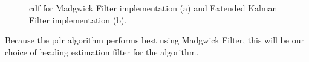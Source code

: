 \begin{figure}[H]
\centering
  \hfill
  \caption{\gls{cdf} for Madgwick Filter implementation (a) and Extended Kalman Filter implementation (b).}
  \label{fig:pdr_cdf}
\end{figure}

Because the \gls{pdr} algorithm performs best using Madgwick Filter, this will be our choice of heading estimation filter for the algorithm.